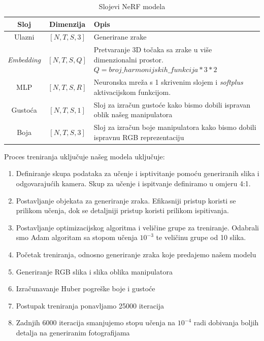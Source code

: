 \documentclass[times, utf8, diplomskirad]{fer}
\begin{document}
\newpage
\begin{table}[H]
    \centering
\caption{Slojevi NeRF modela}
\label{tab:nerf}
\begin{tabular}{|c|c|p{10cm}|}
  \hline
  Sloj & Dimenzija & Opis \\
  \hline
  Ulazni & $[N, T, S, 3]$ & Generirane zrake \\
  \hline
  \textit{Embedding} & $[N, T, S, Q]$ & Pretvaranje 3D točaka sa zrake u više dimenzionalni prostor.
  $Q = broj\_harmonijskih\_funkcija * 3 * 2$ \\
  \hline
  MLP & $[N, T, S, R]$ & Neuronska mreža s 1 skrivenim slojem i \textit{softplus} aktivacijskom funkcijom. \\
  \hline
  Gustoća & $[N, T, S, 1]$ & Sloj za izračun gustoće kako bismo dobili ispravan oblik našeg manipulatora \\
  \hline
  Boja & $[N, T, S, 3]$ & Sloj za izračun boje manipulatora kako bismo dobili ispravnu RGB reprezentaciju \\
  \hline
\end{tabular}
\end{table}

Proces treniranja uključuje našeg modela uključuje:
\begin{enumerate}
    \item Definiranje skupa podataka za učenje i isptivitanje pomoću generiranih slika i odgovarajućih kamera. Skup za učenje i ispitvanje definiramo u omjeru 4:1.
    \item Postavljanje objekata za generiranje zraka. Efikasniji pristup koristi se prilikom učenja, dok se detaljniji pristup koristi prilikom ispitivanja.
    \item Postavljanje optimizacijskog algoritma i veličine grupe za treniranje. Odabrali smo Adam algoritam \cite{kingma2017adammethodstochasticoptimization} sa stopom učenja $10^{-3}$ te veličinu grupe od 10 slika.
    \item Početak treniranja, odnosno generiranje zraka koje predajemo našem modelu
    \item Generiranje RGB slika i slika oblika manipulatora
    \item Izračunavanje Huber pogreške boje i gustoće
    \item Postupak treniranja ponavljamo 25000 iteracija
    \item Zadnjih 6000 iteracija smanjujemo stopu učenja na $10^{-4}$ radi dobivanja boljih detalja na generiranim fotografijama
\end{enumerate}
\newpage
\end{document}
